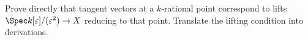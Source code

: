 \begin{problem}
Prove directly that tangent vectors at a $k$-rational point correspond to lifts $\Spec k[\varepsilon]/(\varepsilon^2)\to X$ reducing to that point. Translate the lifting condition into derivations.
\end{problem}
